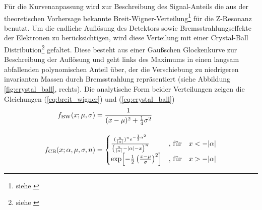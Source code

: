 Für die Kurvenanpassung wird zur Beschreibung des Signal-Anteils die aus der
theoretischen Vorhersage bekannte Breit-Wigner-Verteilung\footnote{siehe
\cite{PhysRev.49.519}} für die Z-Resonanz benutzt. Um die endliche Auflösung
des Detektors sowie Bremsstrahlungseffekte der Elektronen zu berücksichtigen,
wird diese Verteilung mit einer Crystal-Ball Distribution\footnote{siehe
\cite[Appendix F]{Gaiser:1982yw}} gefaltet. Diese besteht aus einer Gaußschen
Glockenkurve zur Beschreibung der Auflösung und geht links des Maximums in
einen langsam abfallenden polynomischen Anteil über, der die Verschiebung zu
niedrigeren invarianten Massen durch Bremsstrahlung repräsentiert (siehe
Abbildung \ref{fig:crystal_ball}, rechts). Die analytische Form beider
Verteilungen zeigen die Gleichungen (\ref{eq:breit_wigner}) und
(\ref{eq:crystal_ball}) 
\begin{align}
    f_\text{BW}(x;\mu,\sigma) &= \frac{1}{(x-\mu)^2+\frac{1}{4}\sigma^2}
    \label{eq:breit_wigner}\\[10pt]
    f_\text{CB}(x;\alpha,\mu,\sigma,n) &=
        \begin{cases}
            \frac{(\frac{n}{|\alpha|})^n e^{-\frac{1}{2}\alpha^2}}
                 {\left( \frac{n}{|\alpha|}-|\alpha|-x \right)^n}
                & \text{, für}\quad x < -|\alpha| \\
            \exp\Bigl[-\frac{1}{2}\left( \frac{x-\mu}{\sigma} \right)^2 \Bigr]
                & \text{, für}\quad x > -|\alpha|
        \end{cases}
    \label{eq:crystal_ball}
\end{align}

